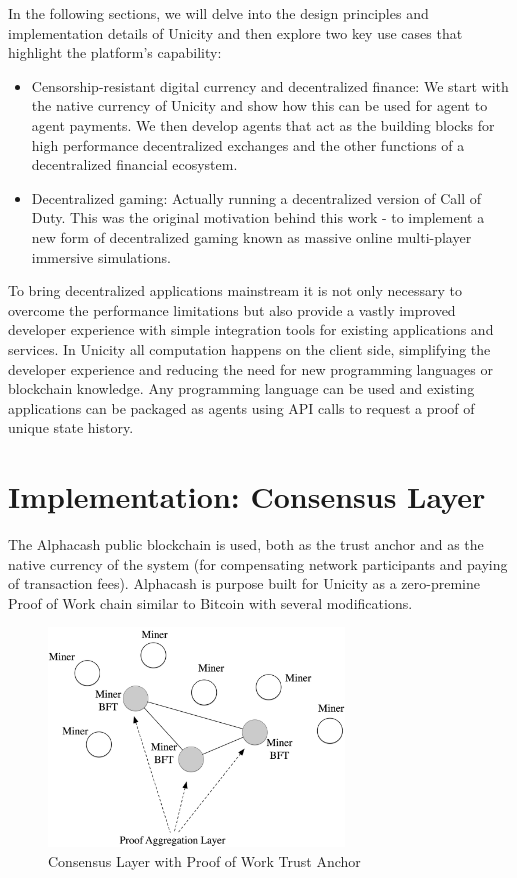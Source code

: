 \documentclass{article}
\begin{document}
\vspace{2mm}

In the following sections, we will delve into the design principles and implementation details of Unicity and then explore two key use cases that highlight the platform's capability:

\begin{itemize}
\setlength{\leftmargin}{1em}
 \item Censorship-resistant digital currency and decentralized finance:  We start with the native currency of Unicity and show how this can be used for agent to agent payments. We then develop agents that act as the building blocks for high performance decentralized exchanges and the other functions of a decentralized financial ecosystem.
 \item Decentralized gaming: Actually running a decentralized version of Call of Duty.  This was the original motivation behind this work - to implement a new form of decentralized gaming known as massive online multi-player immersive simulations.
\end{itemize}


To bring decentralized applications mainstream it is not only necessary to overcome the performance limitations but also provide a vastly improved developer experience with simple integration tools for existing applications and services. In Unicity all computation happens on the client side, simplifying the developer experience and reducing the need for new programming languages or blockchain knowledge. Any programming language can be used and existing applications can be packaged as agents  using API calls to request a proof of unique state history.


\section{Implementation: Consensus Layer}

The Alphacash public blockchain is used, both as the trust anchor and as the native currency of the system (for compensating network participants and paying of transaction fees). Alphacash is purpose built for Unicity as a zero-premine Proof of Work chain similar to Bitcoin with several modifications.

\begin{figure}[htbp]
    \centering
    \includegraphics[width=0.7\textwidth]{Miners.png}
    \caption{Consensus Layer with Proof of Work Trust Anchor}
    \label{fig:miners}
\end{figure}
\end{document}
